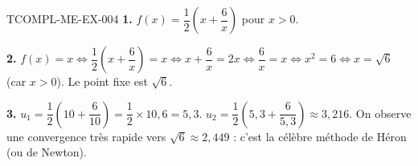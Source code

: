 \begin{corrige}{TCOMPL-ME-EX-004}
\textbf{1.} $f(x) = \dfrac{1}{2}\left(x+\dfrac{6}{x}\right)$ pour $x>0$.

\textbf{2.} $f(x)=x \iff \dfrac{1}{2}\left(x+\dfrac{6}{x}\right)=x \iff x+\dfrac{6}{x}=2x \iff \dfrac{6}{x}=x \iff x^2=6 \iff x=\sqrt{6}$ (car $x>0$). Le point fixe est $\sqrt{6}$.

\textbf{3.} $u_1 = \dfrac{1}{2}\left(10+\dfrac{6}{10}\right) = \dfrac{1}{2}\times10{,}6 = 5{,}3$. $u_2 = \dfrac{1}{2}\left(5{,}3+\dfrac{6}{5{,}3}\right) \approx 3{,}216$. On observe une convergence très rapide vers $\sqrt{6}\approx2{,}449$ : c'est la célèbre méthode de Héron (ou de Newton).
\end{corrige}

